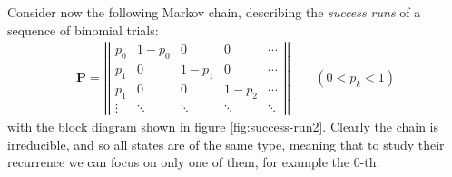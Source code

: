 \documentclass[../template.tex]{subfiles}
\begin{document}
\begin{example}
Consider now the following Markov chain, describing the \textit{success runs} of a sequence of binomial trials:
\begin{align*}
    \textbf{P} =  \left|\left|\begin{array}{ccccc}
    p_0 & 1-p_0 & 0 & 0 & \cdots \\ 
    p_1 & 0 & 1-p_1 & 0 & \cdots \\ 
    p_1 & 0 & 0 & 1-p_2 & \cdots \\ 
    \vdots & \ddots & \ddots & \ddots & \ddots
    \end{array}\right|\right| \qquad (0 <p_k < 1)
\end{align*}
with the block diagram shown in figure \ref{fig:success-run2}. Clearly the chain is irreducible, and so all states are of the same type, meaning that to study their recurrence we can focus on only one of them, for example the $0$-th.

\medskip


\end{example}
\end{document}
